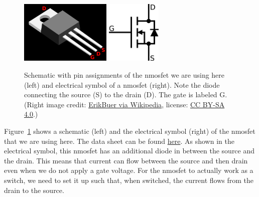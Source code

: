 \begin{figure}[bt]
    \centering
    \includegraphics[height=3cm]{graphics/04_peltier/nmos_pins.png}\hspace{2cm}
    \includegraphics[height=3cm]{graphics/04_peltier/nMOSFET_symbol.png}
    \caption{Schematic with pin assignments of the n\ac{mosfet} we are using here (left) and electrical symbol of a n\ac{mosfet} (right). Note the diode connecting the source (S) to the drain (D). The gate is labeled G. (Right image credit: \href{https://en.wikipedia.org/wiki/Electronic_symbol\#/media/File:Enh_N_channel_Mosfet.svg}{ErikBuer via Wikipedia}, license: \href{https://creativecommons.org/licenses/by-sa/4.0/}{CC BY-SA 4.0}.)}
    \label{fig:peltier:mosfet_used}
\end{figure}
Figure~\ref{fig:peltier:mosfet_used} shows a schematic (left) and the electrical symbol (right) of the n\ac{mosfet} that we are using here. The data sheet can be found \href{https://cdn-shop.adafruit.com/datasheets/irlb8721pbf.pdf}{here}. As shown in the electrical symbol, this n\ac{mosfet} has an additional diode in between the source and the drain. This means that current can flow between the source and then drain even when we do not apply a gate voltage. For the n\ac{mosfet} to actually work as a switch, we need to set it up such that, when switched, the current flows from the drain to the source. 


